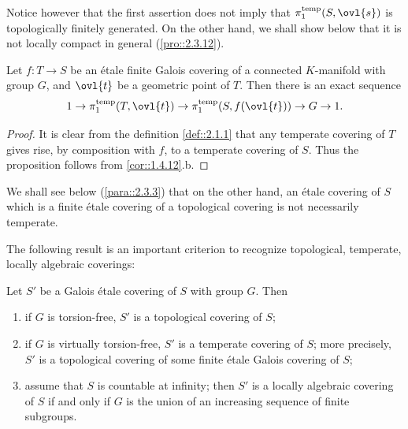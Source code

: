 Notice however that the first assertion does not imply that
$\pi_1^{\mathrm{temp}}(S,\ovl{s})$ is topologically finitely generated. 
On the other hand, we shall show below that it is not locally compact in
general (\ref{pro::2.3.12}).

\begin{pro}\label{pro::2.1.7} Let $f: T\to S$ be an \'etale finite Galois
 covering of a connected $K$-manifold with group $G$, and $\ovl{t}$ be a
 geometric point of $T$. Then there is an exact sequence 
 \begin{equation*}
  1\to \pi_1^{\mathrm{temp}}(T,\ovl{t})\to
 \pi_1^{\mathrm{temp}}(S,f(\ovl{t}))\to G\to 1. 
 \end{equation*}
\end{pro}

\begin{proof}
 It is clear from the definition \ref{def::2.1.1} that any temperate covering
 of $T$ gives rise, by composition with $f$, to a 
 temperate covering of $S$. Thus the proposition follows from
 \ref{cor::1.4.12}.b.
\end{proof}

\medskip{} We shall see below (\ref{para::2.3.3})
that on the 
other hand, an \'etale covering of $S$ which is a finite \'etale
covering of a topological covering is not necessarily temperate.

\medskip The following result is an important criterion to recognize
topological, \resp temperate, \resp locally algebraic coverings: 

\begin{thm}\label{thm::2.1.8} Let $S'$ be a Galois \'etale covering of
 $S$ with group $G$. Then
 \begin{enumerate}
  \renewcommand{\theenumi}{\alph{enumi}}
  \item if $G$ is torsion-free,
	$S'$ is a topological covering of $S$;
  \item if $G$ is virtually torsion-free, $S'$ is a temperate covering
	of $S$; more precisely, $S'$ is a topological covering of some
	finite \'etale Galois covering of $S$;
  \item assume that $S$ is countable at infinity; then $S'$ is a locally
	algebraic covering of $S$ if and only if $G$ is the union of an
	increasing sequence of finite subgroups.
 \end{enumerate}
\end{thm}

